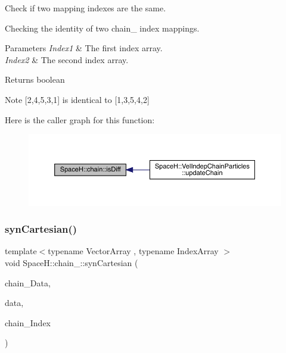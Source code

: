 Check if two mapping indexes are the same. 

Checking the identity of two chain_ index mappings.
\begin{DoxyParams}{Parameters}
{\em Index1} & The first index array. \\
\hline
{\em Index2} & The second index array. \\
\hline
\end{DoxyParams}
\begin{DoxyReturn}{Returns}
boolean 
\end{DoxyReturn}
\begin{DoxyNote}{Note}
\mbox{[}2,4,5,3,1\mbox{]} is identical to \mbox{[}1,3,5,4,2\mbox{]} 
\end{DoxyNote}
Here is the caller graph for this function\+:
\nopagebreak
\begin{figure}[H]
\begin{center}
\leavevmode
\includegraphics[width=350pt]{namespace_space_h_1_1chain_ab54ce920a542c01625ee7d6c625cc5c4_icgraph}
\end{center}
\end{figure}
\mbox{\label{namespace_space_h_1_1chain_a1ba7809b40a52959d0566753b1c2eaee}} 
\subsubsection{\texorpdfstring{syn\+Cartesian()}{synCartesian()}}
{\footnotesize\ttfamily template$<$typename Vector\+Array , typename Index\+Array $>$ \\
void Space\+H\+::chain_\+::syn\+Cartesian (\begin{DoxyParamCaption}\item[{const Vector\+Array \&}]{chain_\+Data,  }\item[{Vector\+Array \&}]{data,  }\item[{const Index\+Array \&}]{chain_\+Index }\end{DoxyParamCaption})}



